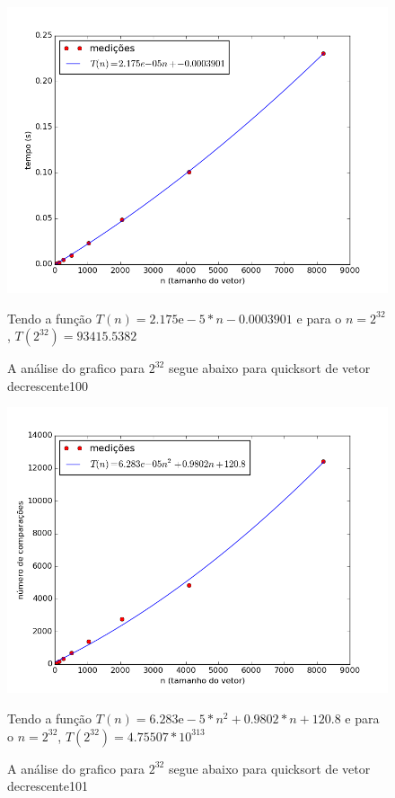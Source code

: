 \documentclass[12pt,a4paper,twoside]{report}
\begin{document}


\begin{figure}[ht]
\centering \includegraphics[scale=0.8]{../quicksort/imagens/quicksortQuaseDecresc100.png}
\caption{A análise do grafico para $2^{32}$ segue abaixo para quicksort de vetor decrescente100}

Tendo a função $T(n) = 2.175\mathrm{e}-5*n - 0.0003901$ e para o $n =2^{32}$, $T(2^{32}) = 93415.5382$ 

\label{fig:quicksortQuaseDecresc100}
\end{figure}

\begin{figure}[ht]
\centering \includegraphics[scale=0.8]{../quicksort/imagens/quicksortQuaseDecresc101.png}
\caption{A análise do grafico para $2^{32}$ segue abaixo para quicksort de vetor decrescente101}


Tendo a função $T(n) = 6.283\mathrm{e}-5*n^2+0.9802*n+120.8$ e para o $n =2^{32}$, $T(2^{32}) = 4.75507*10^{313}$ 

\label{fig:quicksortQuaseDecresc101}
\end{figure}
\end{document}
